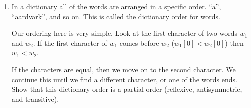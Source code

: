 \documentclass[basic, header]{nosvagor-notes}
\begin{document}
\begin{enumerate}[itemsep=5em]
    \item In a dictionary all of the words are arranged in a specific order.
      ``a'', ``aardvark'', and so on.  This is called the dictionary order for
      words.

      Our ordering here is very simple.  Look at the first character of two
      words $w_1$ and $w_2$.  If the first character of $w_1$ comes before
      $w_2$ ($w_1[0] < w_2[0]$) then $w_1 < w_2$.

      If the characters are equal, then we move on to the second character. We
      continue this until we find a different character, or one of the words
      ends. Show that this dictionary order is a partial order (reflexive,
      antisymmetric, and transitive).

  \end{enumerate}
\end{document}
